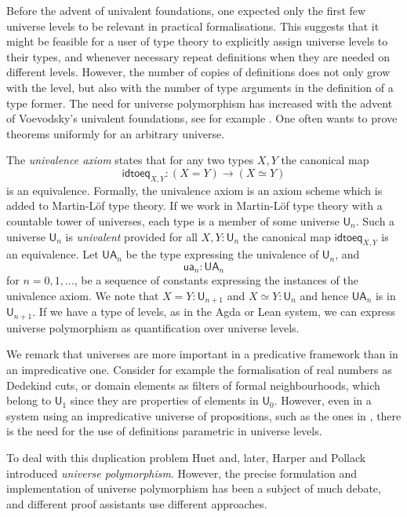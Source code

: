 \documentclass[11pt,a4paper]{article}
\theoremstyle{definition}
\def\UU{\mathsf{U}}
\def\Level{\mathsf{Level}}
\newcommand{\idtoeq}{\mathsf{idtoeq}}
\newcommand{\ua}{\mathsf{ua}}
\newcommand{\UA}{\mathsf{UA}}
\begin{document}
Before the advent of univalent foundations, one expected only the first few universe
levels to be relevant in practical formalisations. This suggests that it might be feasible for a user of type theory to explicitly assign universe levels to their types, and whenever necessary repeat definitions when they are needed on different levels. However, the number of copies of definitions does not only grow with the level, but also with the number of type arguments in the definition of a type former.
The need for universe polymorphism has increased with the advent of Voevodsky's univalent foundations,
see for example \cite{VV}. One often wants to prove theorems uniformly for an arbitrary universe.

The {\em univalence axiom} states that for any two types $X,Y$ the canonical map
$$
\idtoeq_{X,Y} : (X=Y)\to (X\simeq Y)
$$
is an equivalence.
Formally, the univalence axiom is an axiom scheme which is added to Martin-Löf type theory. If we work in Martin-Löf type theory with a countable tower of universes, each type is a member of some universe $\UU_n$. Such a universe $\UU_n$ is {\em univalent} provided for all $X,Y : \UU_n$ the canonical map $\idtoeq_{X,Y}$ is an equivalence. Let $\UA_n$ be the type expressing the univalence of $\UU_n$, and
$$
\ua_n : \UA_n
$$
for $n = 0,1,\ldots$, be a sequence of constants expressing the instances of the univalence axiom. We note that $X = Y : \UU_{n+1}$ and $X\simeq Y : \UU_n$ and hence $\UA_n$ is in $\UU_{n+1}$.
If we have a type of levels, as in the Agda or Lean system,
we can express universe polymorphism as quantification over universe levels.

We remark that universes are more important in a predicative framework than in an impredicative one.
Consider for example the formalisation of real numbers as Dedekind cuts, or domain elements as filters of formal neighbourhoods, which belong to $\UU_1$ since they are properties of elements in $\UU_0$.
However, even in a system using an impredicative universe of propositions,
such as the ones in \cite{Huet87,moura:lean}, there is the need for the use of definitions parametric
in universe levels.


 To deal with this duplication problem Huet \cite{Huet87} and, later,
 Harper and Pollack \cite{HarperP91} introduced {\em universe polymorphism}.
 However, the precise formulation and implementation of universe polymorphism has been a subject of
 much debate, and different proof assistants use different approaches.
\end{document}
